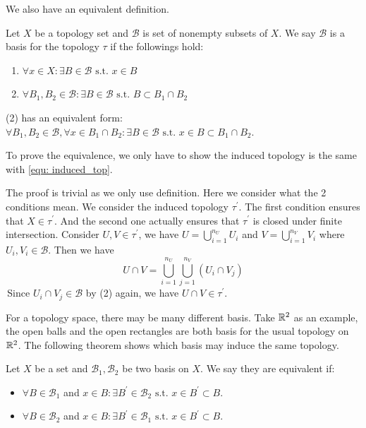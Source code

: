 We also have an equivalent definition.
\begin{definition}
    Let $X$ be a topology set and $\mathcal{B}$ is set of nonempty subsets of $X$. We say $\mathcal{B}$ is a basis for the topology $\tau$ if the followings hold:
    \begin{enumerate}
        \item $\forall x\in X : \exists B\in \mathcal{B} \text{ s.t. } x\in B$
        \item $\forall B_1,B_2\in \mathcal{B} : \exists B\in \mathcal{B} \text{ s.t. } B\subset B_1\cap B_2$ 
    \end{enumerate}
    (2) has an equivalent form: $\forall B_1,B_2\in \mathcal{B}, \forall x \in B_1\cap B_2 : \exists B\in \mathcal{B} \text{ s.t. } x\in B\subset B_1\cap B_2$.
\end{definition}
\begin{remark}
    To prove the equivalence, we only have to show the induced topology is the same with \eqref{equ: induced_top}. 

    The proof is trivial as we only use definition. Here we consider what the 2 conditions mean. We consider the induced topology $\tau^{\prime}$. 
    The first condition ensures that $X\in \tau^{\prime}$. And the second one actually ensures that $\tau^{\prime}$ is closed under finite intersection. 
    Consider $U,V \in \tau^{\prime}$, we have $U = \bigcup_{i = 1}^{n_{U}} U_i$ and $V = \bigcup_{i = 1}^{n_{V}} V_i$ where $U_i,V_i \in \mathcal{B}$. Then we have
    $$U\cap V = \bigcup_{i=1}^{n_U} \bigcup_{j=1}^{n_V} (U_i \cap V_j)$$
    \,Since $U_i \cap V_j \in \mathcal{B}$ by (2) again, we have $U\cap V \in \tau^{\prime}$.
\end{remark}

For a topology space, there may be many different basis. Take $\mathbb{R}^{2}$ as an example, the open balls and the open rectangles are both basis for the usual topology on $\mathbb{R}^{2}$. 
The following theorem shows which basis may induce the same topology.
\begin{definition}
    Let $X$ be a set and $\mathcal{B}_1, \mathcal{B}_2$ be two basis on $X$. We say they are equivalent if:
\begin{itemize}
    \item $\forall B\in \mathcal{B}_1$ and $x\in B : \exists B^{\prime} \in \mathcal{B}_2 \text{ s.t. } x\in B^{\prime}\subset B$.
    \item$ \forall B\in \mathcal{B}_2$ and $x\in B : \exists B^{\prime} \in \mathcal{B}_1 \text{ s.t. } x\in B^{\prime}\subset B$.
\end{itemize}    
\end{definition}

